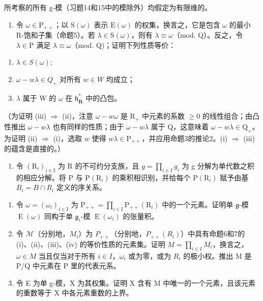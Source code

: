 
所考察的所有 g-模（习题14和15中的模除外）均假定为有限维的。

\begin{enumerate}
\def\labelenumi{\arabic{enumi})}
\tightlist
\item
  令 \(\omega \in \mathrm{P}_{++}\)；以 \(\mathrm{S}(\omega)\) 表示 \(\mathrm{E}(\omega)\) 的权集，换言之，它是包含 \(\omega\) 的最小 R-饱和子集（命题5）。若 \(\lambda \in \mathrm{S}(\omega)\)，则有 \(\lambda \equiv \omega\)（mod. Q）。反之，令 \(\lambda \in \mathrm{P}\) 满足 \(\lambda \equiv \omega\)（mod. Q)；证明下列性质等价：
\end{enumerate}

\begin{enumerate}
\def\labelenumi{(\roman{enumi})}
\item
  \(\lambda \in S(\omega);\)
\item
  \(\omega - w\lambda \in Q_{+}\) 对所有 \(w \in W\) 均成立；
\item
  \(\lambda\) 属于 W 的 \(\omega\) 在 \(\mathfrak{h}_{\mathbf{R}}^{*}\) 中的凸包。
\end{enumerate}

（为证明 (iii) \(\Longrightarrow\) (ii)，注意 \(\omega - w\omega\) 是 \(\mathrm{R}_{+}\) 中元素的系数 \(\geq 0\) 的线性组合；由凸性推出 \(\omega - w\lambda\) 也有同样的性质；由于 \(\omega - w\lambda\) 属于 Q，这意味着 \(\omega - w\lambda \in \mathrm{Q}_{+}\)。为证明 (ii) \(\Longrightarrow\) (i)，选取 \(w\) 使得 \(w\lambda \in \mathrm{P}_{++}\)，并应用命题3的推论2。(i) \(\Longrightarrow\) (iii) 的蕴含是直接的。）

\begin{enumerate}
\def\labelenumi{\arabic{enumi})}
\setcounter{enumi}{1}
\tightlist
\item
  令 \((\mathrm{R}_{i})_{i\in\mathrm{I}}\) 为 R 的不可约分支族，且 \(g=\prod_{i\in I}g_{i}\) 为 g 分解为单代数之积的相应分解。将 P 与 \(\mathrm{P}(\mathrm{R}_{i})\) 的乘积相识别，并给每个 \(\mathrm{P}(\mathrm{R}_{i})\) 赋予由基 \(B_{i}=B\cap R_{i}\) 定义的序关系。
\end{enumerate}

\begin{enumerate}
\def\labelenumi{\alph{enumi})}
\item
  令 \(\omega = (\omega_{i})_{i\in \mathrm{I}}\) 为 \(\mathrm{P}_{++} = \prod_{i\in \mathrm{I}}\mathrm{P}_{++}(\mathrm{R}_i)\) 中的一个元素。证明单 \(\mathfrak{g}\)-模 \(\operatorname {E}(\omega)\) 同构于单 \(\mathfrak{g}_i\)-模 \(\operatorname {E}(\omega_i)\) 的张量积。
\item
  令 \(\mathcal{M}\)（分别地，\(M_{i}\)）为 \(P_{++}\)（分别地，\(P_{++}(R_{i})\)）中具有命题6和7的 (i)、(ii)、(iii)、(iv) 的等价性质的元素集。证明 \(M = \prod_{i \in I} M_{i}\)，换言之，\(\omega \in M\) 当且仅当对于所有 \(i \in I\)，\(\omega_{i}\) 或为零，或为 \(R_{i}\) 的极小权。推出 M 是 P/Q 中元素在 P 里的代表元系。
\item
  令 E 为单 g-模，X 为其权集。证明 X 含有 M 中唯一的一个元素，且该元素的重数等于 X 中各元素重数的上界。
\end{enumerate}


